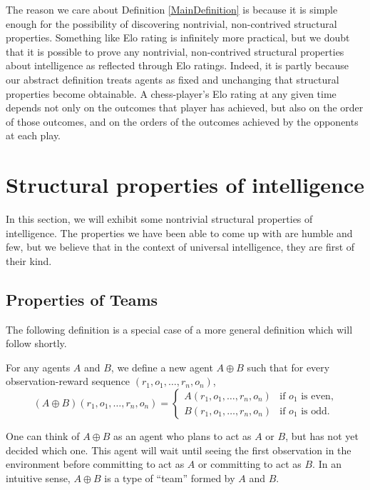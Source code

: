 \documentclass[twoside,11pt]{article}
\begin{document}
    The reason we care about Definition \ref{MainDefinition} is
    because it is simple enough for the possibility of
    discovering nontrivial, non-contrived structural properties.
    Something like Elo rating is infinitely more practical, but
    we doubt that it is possible to prove any nontrivial,
    non-contrived structural properties about intelligence as
    reflected through Elo ratings. Indeed, it is partly because
    our abstract definition treats agents as fixed and unchanging
    that structural properties become obtainable. A chess-player's
    Elo rating at any given time depends not only on the outcomes
    that player has achieved, but also on the order of those outcomes,
    and on the orders of the outcomes achieved by the opponents
    at each play.



\section{Structural properties of intelligence}

In this section, we will exhibit some nontrivial structural properties of intelligence.
The properties we have been able to come up with are humble and few,
but we believe that in the context of universal intelligence, they are
first of their kind.

\subsection{Properties of Teams}

The following definition is a special case of a more general definition which will
follow shortly.

\begin{definition}
\label{flexiblespecialcase}
For any agents $A$ and $B$, we define a new
agent $A\oplus B$ such that for every observation-reward sequence
$(r_1,o_1,\ldots,r_n,o_n)$,
\[
(A\oplus B)(r_1,o_1,\ldots,r_n,o_n) =
    \begin{cases}
        A(r_1,o_1,\ldots,r_n,o_n) & \mbox{if $o_1$ is even,}\\
        B(r_1,o_1,\ldots,r_n,o_n) & \mbox{if $o_1$ is odd.}
    \end{cases}
\]
\end{definition}

One can think of $A\oplus B$ as an agent who plans to act as $A$ or $B$,
but has not yet decided which one. This agent will wait until seeing the first
observation in the environment before committing to act as $A$ or committing
to act as $B$. In an intuitive sense, $A\oplus B$ is a type of ``team'' formed
by $A$ and $B$.
\end{document}
